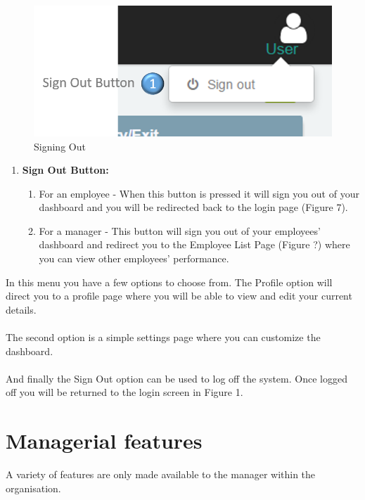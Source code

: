 \documentclass[11pt,a4paper]{article}
\begin{document}
\begin{figure}[H]
	\begin{center}
		\includegraphics[scale=0.7]{../Images/Getting_Started/logout_numbered}
		\caption{Signing Out}
	\end{center}
\end{figure}

\begin{enumerate}
	\item \textbf{Sign Out Button:}
		\begin{enumerate}
			\item For an employee - When this button is pressed it will sign you out of your dashboard and you will be redirected back to the login page (Figure 7).
			\item For a manager - This button will sign you out of your employees' dashboard and redirect you to the Employee List Page (Figure ?) where you can view other employees' performance.
		\end{enumerate} 
\end{enumerate}
\noindent
In this menu you have a few options to choose from. The Profile option will direct you to a profile page where you will be able to view and edit your current details. \\ \\
The second option is a simple settings page where you can customize the dashboard.\\ \\
And finally the Sign Out option can be used to log off the system. Once logged off you will be returned to the login screen in Figure 1.

\pagebreak

\section{Managerial features}
A variety of features are only made available to the manager within the organisation.
\end{document}
